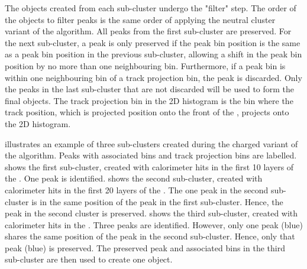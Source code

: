 The \ShowerPeak objects created from each sub-cluster undergo the "\ShowerPeak filter" step. The order of the \ShowerPeak objects to filter peaks is the same order of applying the neutral cluster variant of the  \peakFinding algorithm. All peaks from the first sub-cluster are preserved. For the next sub-cluster, a peak  is only preserved if the peak bin position is the same as a peak bin position in the previous sub-cluster, allowing a shift in the peak bin position by no more than one neighbouring bin. Furthermore, if a peak bin is within one neighbouring bin of a track projection bin, the peak is discarded. Only the peaks in the last sub-cluster that are not discarded will be used to form the final \ShowerPeak objects. The track projection bin in the 2D histogram is the bin where the track position, which is projected position onto the front of the \ECAL, projects onto the 2D histogram.




 illustrates an example of three sub-clusters created during the charged variant of the \peakFinding algorithm. Peaks with associated bins and track projection bins are labelled.  shows the first sub-cluster, created with calorimeter hits in the first 10 layers of the \ECAL. One peak is identified.  shows the second sub-cluster, created with calorimeter hits in the first 20 layers of the \ECAL. The one peak in the second sub-cluster is in the same position of the peak in the first sub-cluster. Hence, the peak in the second cluster is preserved.  shows the third sub-cluster, created with calorimeter hits in the \ECAL. Three peaks are identified. However, only one peak (blue) shares the  same position of the peak in the second sub-cluster. Hence, only that peak (blue) is preserved. The preserved peak and associated bins in the third sub-cluster are then used to create one \ShowerPeak object.


